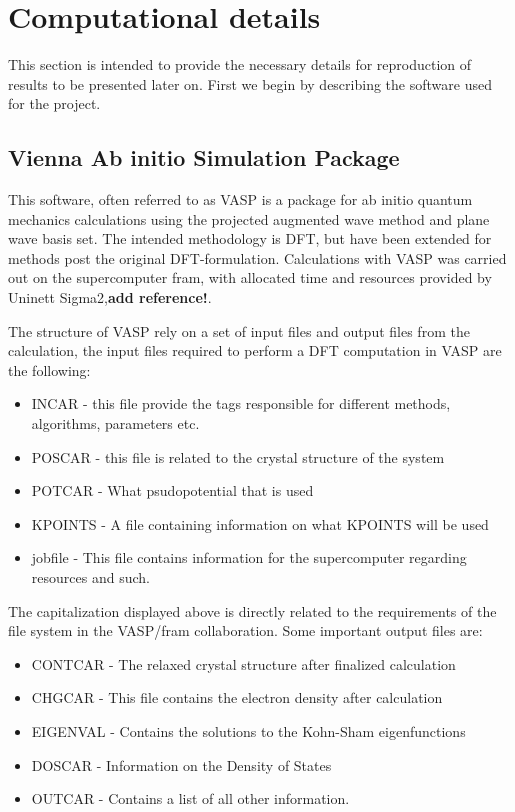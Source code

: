 \chapter{Computational details}
\label{sec:Computation}

This section is intended to provide the necessary details for reproduction of results to be presented later on. First we begin by describing the software used for the project. 

\section{Vienna Ab initio Simulation Package}
This software, often referred to as VASP is a package for ab initio quantum mechanics calculations using the projected augmented wave method and plane wave basis set. The intended methodology is DFT, but have been extended for methods post the original DFT-formulation. Calculations with VASP was carried out on the supercomputer fram, with allocated time and resources provided by Uninett Sigma2,\textbf{add reference!}.

The structure of VASP rely on a set of input files and output files from the calculation, the input files required to perform a DFT computation in VASP are the following:
\begin{itemize}
    \item INCAR - this file provide the tags responsible for different methods, algorithms, parameters etc.
    \item POSCAR - this file is related to the crystal structure of the system
    \item POTCAR - What psudopotential that is used
    \item KPOINTS - A file containing information on what KPOINTS will be used
    \item jobfile - This file contains information for the supercomputer regarding resources and such.
\end{itemize}
The capitalization displayed above is directly related to the requirements of the file system in the VASP/fram collaboration. Some important output files are:
\begin{itemize}
    \item CONTCAR - The relaxed crystal structure after finalized calculation
    \item CHGCAR - This file contains the electron density after calculation
    \item EIGENVAL - Contains the solutions to the Kohn-Sham eigenfunctions
    \item DOSCAR - Information on the Density of States
    \item OUTCAR - Contains a list of all other information.
\end{itemize}

